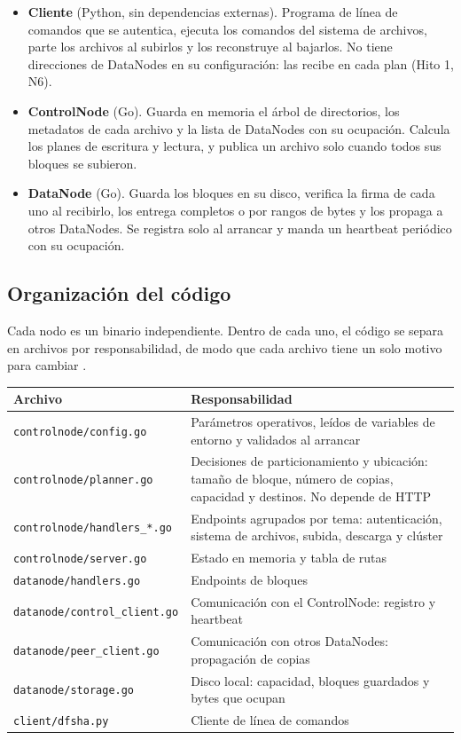 \documentclass[10pt]{article}
\begin{document}
\begin{itemize}
\item \textbf{Cliente} (Python, sin dependencias externas). Programa de línea de comandos que se autentica, ejecuta los comandos del sistema de archivos, parte los archivos al subirlos y los reconstruye al bajarlos. No tiene direcciones de DataNodes en su configuración: las recibe en cada plan (Hito 1, N6).
\item \textbf{ControlNode} (Go). Guarda en memoria el árbol de directorios, los metadatos de cada archivo y la lista de DataNodes con su ocupación. Calcula los planes de escritura y lectura, y publica un archivo solo cuando todos sus bloques se subieron.
\item \textbf{DataNode} (Go). Guarda los bloques en su disco, verifica la firma de cada uno al recibirlo, los entrega completos o por rangos de bytes y los propaga a otros DataNodes. Se registra solo al arrancar y manda un heartbeat periódico con su ocupación.
\end{itemize}

\subsection{Organización del código}

Cada nodo es un binario independiente. Dentro de cada uno, el código se separa en archivos por responsabilidad, de modo que cada archivo tiene un solo motivo para cambiar .

\begin{xltabular}{\linewidth}{@{}L{5.2cm}Y@{}}
\toprule
Archivo & Responsabilidad \\
\midrule\endhead
\texttt{controlnode/config.go} & Parámetros operativos, leídos de variables de entorno y validados al arrancar \\
\texttt{controlnode/planner.go} & Decisiones de particionamiento y ubicación: tamaño de bloque, número de copias, capacidad y destinos. No depende de HTTP \\
\texttt{controlnode/handlers\_*.go} & Endpoints agrupados por tema: autenticación, sistema de archivos, subida, descarga y clúster \\
\texttt{controlnode/server.go} & Estado en memoria y tabla de rutas \\
\texttt{datanode/handlers.go} & Endpoints de bloques \\
\texttt{datanode/control\_client.go} & Comunicación con el ControlNode: registro y heartbeat \\
\texttt{datanode/peer\_client.go} & Comunicación con otros DataNodes: propagación de copias \\
\texttt{datanode/storage.go} & Disco local: capacidad, bloques guardados y bytes que ocupan \\
\texttt{client/dfsha.py} & Cliente de línea de comandos \\
\bottomrule
\end{xltabular}
\end{document}
